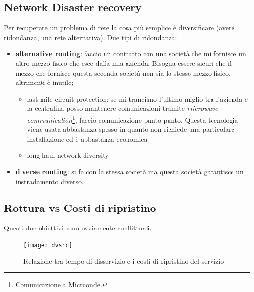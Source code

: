 \subsection{Network Disaster recovery}

Per recuperare un problema di rete la cosa più semplice è diversificare (avere
ridondanza, una rete alternativa). Due tipi di ridondanza:
\begin{itemize}
  \item \textbf{alternative routing}: faccio un contratto con una società che
  mi fornisce un altro mezzo fisico che esce dalla mia azienda. Bisogna essere
sicuri che il mezzo che fornisce questa seconda società non sia lo stesso mezzo
fisico, altrimenti è inutile;
  \begin{itemize}
    \item last-mile circuit protection: se mi tranciano l'ultimo miglio tra
l'azienda e la centralina posso mantenere comunicazioni tramite
\textit{microwave communication}\footnote{Comunicazione a Microonde.}, faccio
comunicazione punto punto. Questa tecnologia viene usata abbastanza spesso in
quanto non richiede una particolare installazione ed è abbastanza economica.
    \item long-haul network diversity
  \end{itemize}
  \item \textbf{diverse routing}: si fa con la stessa società ma questa società
garantisce un instradamento diverso.
\end{itemize}

\subsection{Rottura vs Costi di ripristino}

Questi due obiettivi sono ovviamente conflittuali.

\begin{figure}[H]
 \centering
 \texttt{[image: dvsrc]}
 \caption{Relazione tra tempo di disservizio e i costi di ripristino del servizio}
\end{figure}

